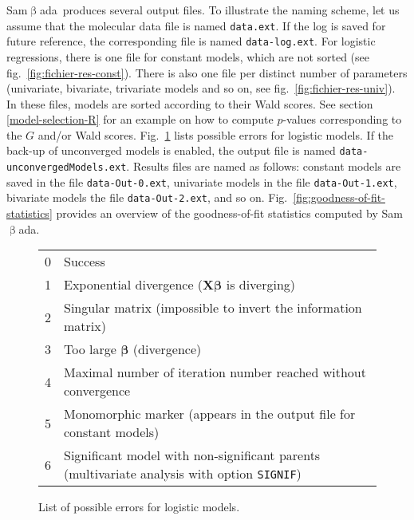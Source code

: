 \documentclass[a4paper,11pt]{article}
\newcommand{\smb}{\textsf{Sam$\upbeta$ada}}
\newcommand{\prog}[1]{\texttt{#1}}
\begin{document}
\smb\ produces several output files.
To illustrate the naming scheme, let us assume that the molecular data file is named \prog{data.ext}.
If the log is saved for future reference, the corresponding file is named \prog{data-log.ext}.
For logistic regressions, there is one file for constant models, which are not sorted (see fig.~\ref{fig:fichier-res-const}).
There is also one file per distinct number of parameters (univariate, bivariate, trivariate models and so on, see fig.~\ref{fig:fichier-res-univ}).
In these files, models are sorted according to their Wald scores.
See section \ref{model-selection-R} for an example on how to compute $p$-values corresponding to the $G$ and/or Wald scores.
Fig.~\ref{fig:errors} lists possible errors for logistic models.
If the back-up of unconverged models is enabled, the output file is named \prog{data-unconvergedModels.ext}.
Results files are named as follows: constant models are saved in the file \prog{data-Out-0.ext}, univariate models in the file \prog{data-Out-1.ext}, bivariate models the file \prog{data-Out-2.ext}, and so on.
Fig.~\ref{fig:goodness-of-fit-statistics} provides an overview of the goodness-of-fit statistics computed by \smb.
%
\begin{figure}[htbp]
\begin{tabular}{ll}
0 & Success \\
1 & Exponential divergence ($\bm{X \beta}$ is diverging)\\
2 & Singular matrix (impossible to invert the information matrix) \\
3 & Too large $\bm{\beta}$ (divergence)\\
4 & Maximal number of iteration number reached without convergence\\
5 & Monomorphic marker (appears in the output file for constant models)\\
6 & Significant model with non-significant parents (multivariate analysis with option \texttt{SIGNIF})\\
\end{tabular}
\caption{List of possible errors for logistic models.}
\label{fig:errors}
\end{figure}
\end{document}

